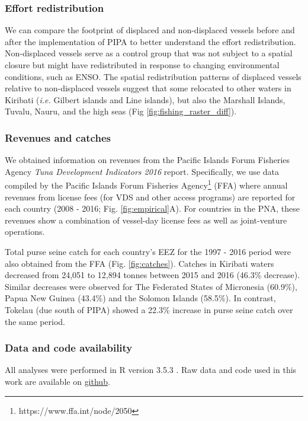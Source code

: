 \documentclass[12pt]{article}
\begin{document}
\subsubsection{Effort redistribution}

We can compare the footprint of displaced and non-displaced vessels before and after the implementation of PIPA to better understand the effort redistribution. Non-displaced vessels serve as a control group that was not subject to a spatial closure but might have redistributed in response to changing environmental conditions, such as ENSO. The spatial redistribution patterns of displaced vessels relative to non-displaced vessels suggest that some relocated to other waters in Kiribati (\emph{i.e.} Gilbert islands and Line islands), but also the Marshall Islands, Tuvalu, Nauru, and the high seas (Fig \ref{fig:fishing_raster_diff}).


\subsubsection{Revenues and catches}

We obtained information on revenues from the Pacific Islands Forum Fisheries Agency \emph{Tuna Development Indicators 2016} report.  Specifically, we use data compiled by the Pacific Islands Forum Fisheries Agency\footnote{https://www.ffa.int/node/2050} (FFA) where annual revenues from license fees (for VDS and other access programs) are reported for each country (2008 - 2016; Fig. \ref{fig:empirical}A). For countries in the PNA, these revenues show a combination of vessel-day license fees as well as joint-venture operations.

Total purse seine catch for each country's EEZ for the 1997 - 2016 period were also obtained from the FFA (Fig. \ref{fig:catches}). Catches in Kiribati waters decreased from 24,051 to 12,894 tonnes between 2015 and 2016 (46.3\% decrease). Similar decreases were observed for The Federated States of Micronesia (60.9\%), Papua New Guinea (43.4\%) and the Solomon Islands (58.5\%). In contrast, Tokelau (due south of PIPA) showed a 22.3\% increase in purse seine catch over the same period.

\subsubsection{Data and code availability}

All analyses were performed in R version 3.5.3 \cite{rcore_2018}. Raw data and code used in this work are available on \href{https://github.com/jcvdav/MPA_displacement}{github}.
\end{document}
